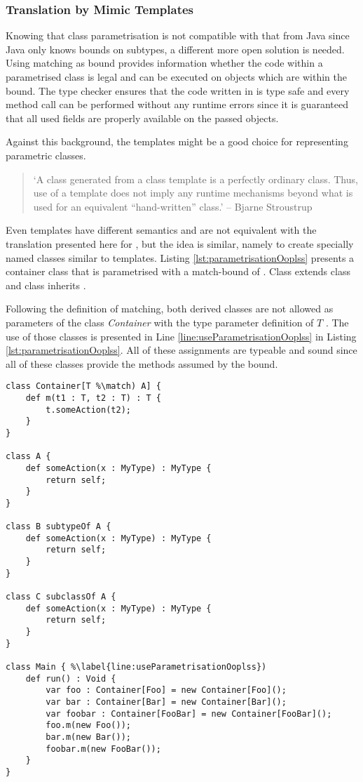 \subsubsection{Translation by Mimic Templates}
Knowing that \ooplss class parametrisation is not compatible with that
from Java since Java only knows bounds on subtypes, a different more open
solution is needed. Using matching as bound provides information whether
the code within a parametrised class is legal and can be executed on
objects which are within the bound. The type checker ensures that the
code written in \ooplss is type safe and every method call can be
performed without any runtime errors since it is guaranteed that all
used fields are properly available on the passed objects.

Against this background, the \cpp templates might be a good choice for
representing parametric classes.

\begin{quotation}
`A class generated from a class template is a perfectly ordinary
class. Thus, use of a template does not imply any runtime mechanisms
beyond what is used for an equivalent ``hand-written'' class.' -- Bjarne
Stroustrup \cite{stroustrup_c++_2000}
\end{quotation}

Even \cpp templates have different semantics and are not equivalent with
the translation presented here for \ooplss, but the idea is similar,
namely to create specially named classes similar to templates. Listing
\ref{lst:parametrisationOoplss} presents a container class that is
parametrised with a match-bound of \A. Class \B extends class \A and
class \C inherits \A.

Following the definition of matching, both derived classes are not
allowed as parameters of the class \emph{Container} with the type
parameter definition of $T$ \match \A. The use of those classes
is presented in Line \ref{line:useParametrisationOoplss} in Listing
\ref{lst:parametrisationOoplss}. All of these assignments are typeable
and sound since all of these classes provide the methods assumed
by the bound.

\begin{lstlisting}[language=ooplss,caption=Parametrisation in \ooplss,label=lst:parametrisationOoplss]
class Container[T %\match) A] {
	def m(t1 : T, t2 : T) : T {
		t.someAction(t2);
	}
}

class A {
	def someAction(x : MyType) : MyType {
		return self;
	}
}

class B subtypeOf A {
	def someAction(x : MyType) : MyType {
		return self;
	}
}

class C subclassOf A {
	def someAction(x : MyType) : MyType {
		return self;
	}
}

class Main { %\label{line:useParametrisationOoplss})
	def run() : Void {
		var foo : Container[Foo] = new Container[Foo]();
		var bar : Container[Bar] = new Container[Bar]();
		var foobar : Container[FooBar] = new Container[FooBar]();
		foo.m(new Foo());
		bar.m(new Bar());
		foobar.m(new FooBar());
	}
}
\end{lstlisting}

